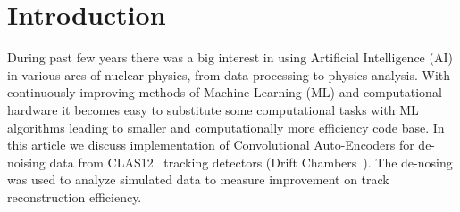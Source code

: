 \section{Introduction}

During past few years there was a big interest in using Artificial Intelligence (AI) in 
various ares of nuclear physics, from data processing to physics analysis. With continuously 
improving methods of Machine Learning (ML) and computational hardware it becomes easy to 
substitute some computational tasks with ML algorithms leading to smaller and computationally
more efficiency code base. In this article we discuss implementation of Convolutional Auto-Encoders 
for de-noising data from CLAS12~\cite{Burkert:2020akg} tracking detectors (Drift 
Chambers~\cite{Mestayer:2020saf}). The de-nosing was used to analyze simulated data to measure
improvement on track reconstruction efficiency.
